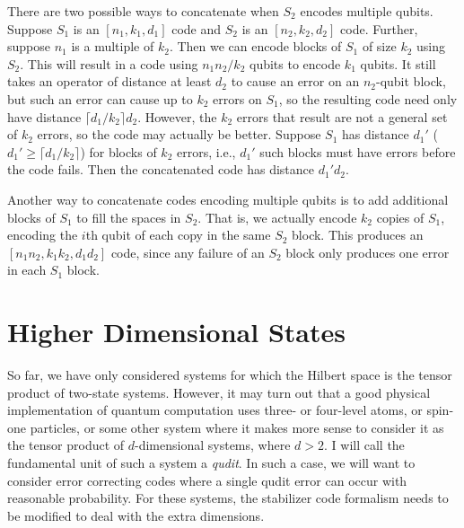 \documentclass{report}
\begin{document}
There are two possible ways to concatenate when $S_2$ encodes multiple 
qubits.  Suppose $S_1$ is an $[n_1, k_1, d_1]$ code and $S_2$ is an $[n_2, 
k_2, d_2]$ code.  Further, suppose $n_1$ is a multiple of $k_2$.  Then we 
can encode blocks of $S_1$ of size $k_2$ using $S_2$.  This will result in a 
code using $n_1 n_2/k_2$ qubits to encode $k_1$ qubits.  It still takes an 
operator of distance at least $d_2$ to cause an error on an $n_2$-qubit 
block, but such an error can cause up to $k_2$ errors on $S_1$, so the 
resulting code need only have distance $\lceil d_1/k_2 \rceil d_2$.  
However, the $k_2$ errors that result are not a general set of $k_2$ errors, 
so the code may actually be better.  Suppose $S_1$ has distance $d_1'$ 
($d_1' \geq \lceil d_1/k_2 \rceil$) for blocks of $k_2$ errors, i.e., $d_1'$ 
such blocks must have errors before the code fails.  Then the concatenated 
code has distance $d_1' d_2$.

Another way to concatenate codes encoding multiple qubits is to add 
additional blocks of $S_1$ to fill the spaces in $S_2$.  That is, we actually 
encode $k_2$ copies of $S_1$, encoding the $i$th qubit of each copy in the 
same $S_2$ block.  This produces an $[n_1 n_2, k_1 k_2, d_1 d_2]$ code, 
since any failure of an $S_2$ block only produces one error in each $S_1$ 
block.

\section{Higher Dimensional States}
\label{sec-qudits}

So far, we have only considered systems for which the Hilbert space is the
tensor product of two-state systems.  However, it may turn out that a good
physical implementation of quantum computation uses three- or four-level
atoms, or spin-one particles, or some other system where it makes more sense
to consider it as the tensor product of $d$-dimensional systems, where
$d > 2$.  I will call the fundamental unit of such a system a {\em qudit}.
In such a case, we will want to consider error correcting codes where a
single qudit error can occur with reasonable probability.  For these systems,
the stabilizer code formalism needs to be modified to deal with the extra
dimensions.
\end{document}
